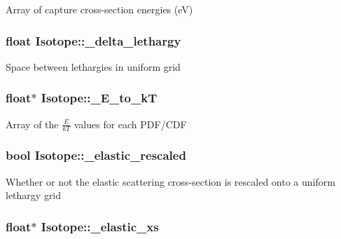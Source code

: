 Array of capture cross-\/section energies (e\-V) \hypertarget{classIsotope_a8210420d4d05778761b1c3f113553b5e}{
\subsubsection[{\-\_\-delta\-\_\-lethargy}]{\setlength{\rightskip}{0pt plus 5cm}float Isotope\-::\-\_\-delta\-\_\-lethargy\hspace{0.3cm}{\ttfamily [private]}}}\label{classIsotope_a8210420d4d05778761b1c3f113553b5e}
Space between lethargies in uniform grid \hypertarget{classIsotope_a99e9d62aea621b33e5250b3def9079f6}{
\subsubsection[{\-\_\-\-E\-\_\-to\-\_\-k\-T}]{\setlength{\rightskip}{0pt plus 5cm}float$\ast$ Isotope\-::\-\_\-\-E\-\_\-to\-\_\-k\-T\hspace{0.3cm}{\ttfamily [private]}}}\label{classIsotope_a99e9d62aea621b33e5250b3def9079f6}
Array of the $ \frac{E}{kT} $ values for each P\-D\-F/\-C\-D\-F \hypertarget{classIsotope_aebd68fdfbe5a0f7df2b5056d2fc902a3}{
\subsubsection[{\-\_\-elastic\-\_\-rescaled}]{\setlength{\rightskip}{0pt plus 5cm}bool Isotope\-::\-\_\-elastic\-\_\-rescaled\hspace{0.3cm}{\ttfamily [private]}}}\label{classIsotope_aebd68fdfbe5a0f7df2b5056d2fc902a3}
Whether or not the elastic scattering cross-\/section is rescaled onto a uniform lethargy grid \hypertarget{classIsotope_a32b731d4c4f2dc04bc460e5220f58609}{
\subsubsection[{\-\_\-elastic\-\_\-xs}]{\setlength{\rightskip}{0pt plus 5cm}float$\ast$ Isotope\-::\-\_\-elastic\-\_\-xs\hspace{0.3cm}{\ttfamily [private]}}}\label{classIsotope_a32b731d4c4f2dc04bc460e5220f58609}
